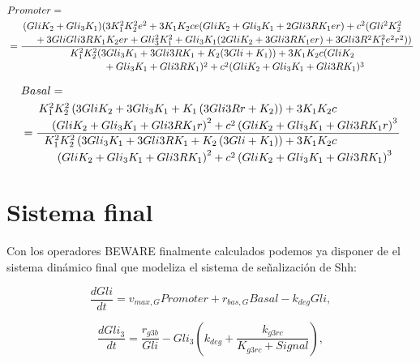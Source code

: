  \begin{equation}
 \begin{split}
  &Promoter=\\&=\frac{\splitdfrac{(Gli K_{2} + Gli_{3} K_{1})(3 K_{1}^{2} K_{2}^{2} e^{2} + 3 K_{1} K_{2} c e (Gli K_{2} + Gli_{3} K_{1} + 2 Gli3R K_{1} e r) +c^{2}(Gli^{2} K_{2}^{2} }{+ 3 Gli Gli3R K_{1} K_{2} e r + Gli_{3}^{2} K_{1}^{2} + Gli_{3} K_{1} (2 Gli K_{2} + 3 Gli3R K_{1} e r) + 3 Gli3R^{2} K_{1}^{2} e^{2} r^{2}))}}{\splitdfrac{K_{1}^{2} K_{2}^{2} (3 Gli_{3} K_{1} + 3 Gli3R K_{1} + K_{2} (3 Gli + K_{1})) + 3 K_{1} K_{2} c (Gli K_{2}}{ + Gli_{3} K_{1} + Gli3R K_{1})^{2} + c^{2} (Gli K_{2} + Gli_{3} K_{1} + Gli3R K_{1})^{3}}}
  \end{split}
 \label{promoter_1}
 \end{equation}
 
 
 \begin{equation}
 \begin{split}
 &Basal=\\&=\frac{\splitdfrac{K_{1}^{2} K_{2}^{2} \left(3 Gli K_{2} + 3 Gli_{3} K_{1} + K_{1} \left(3 Gli3R r + K_{2}\right)\right) + 3 K_{1} K_{2} c}{ \left(Gli K_{2} + Gli_{3} K_{1} + Gli3R K_{1} r\right)^{2} + c^{2} \left(Gli K_{2} + Gli_{3} K_{1} + Gli3R K_{1} r\right)^{3}}}{\splitdfrac{K_{1}^{2} K_{2}^{2} \left(3 Gli_{3} K_{1} + 3 Gli3R K_{1} + K_{2} \left(3 Gli + K_{1}\right)\right) + 3 K_{1} K_{2} c }{\left(Gli K_{2} + Gli_{3} K_{1} + Gli3R K_{1}\right)^{2} + c^{2} \left(Gli K_{2} + Gli_{3} K_{1} + Gli3R K_{1}\right)^{3}}}
 \end{split}
 \label{basa_1}
 \end{equation}
 
   
\section{Sistema final}
 Con los operadores BEWARE finalmente calculados podemos ya disponer de el sistema dinámico final que modeliza el sistema de señalización de Shh:
 
 \begin{equation}
 \frac{dGli}{dt} = v_{max,G}Promoter+r_{bas,G}Basal-k_{deg}Gli,
 \label{eq1:1}
 \end{equation}
 
 \begin{equation}
 \frac{dGli_3}{dt} = \frac{r_{g3b}}{Gli}-Gli_3\left(k_{deg}+\frac{k_{g3rc}}{K_{g3rc}+Signal}\right),
 \label{eq1:2}
 \end{equation}
 
